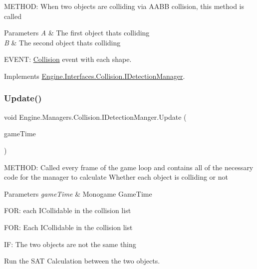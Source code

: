 M\+E\+T\+H\+OD\+: When two objects are colliding via A\+A\+BB collision, this method is called 


\begin{DoxyParams}{Parameters}
{\em A} & The first object that\textquotesingle{}s colliding\\
\hline
{\em B} & The second object that\textquotesingle{}s colliding\\
\hline
\end{DoxyParams}
E\+V\+E\+NT\+: \hyperlink{a00268}{Collision} event with each shape. 

Implements \hyperlink{a00430_ac0f8278b5b5a1c103da46f154ad088dc}{Engine.\+Interfaces.\+Collision.\+I\+Detection\+Manager}.

\mbox{\label{a00502_ac032340610657f865bdd3b7a82e316c3}} 
\subsubsection{\texorpdfstring{Update()}{Update()}}
{\footnotesize\ttfamily void Engine.\+Managers.\+Collision.\+I\+Detection\+Manger.\+Update (\begin{DoxyParamCaption}\item[{Game\+Time}]{game\+Time }\end{DoxyParamCaption})\hspace{0.3cm}{\ttfamily [inline]}}



M\+E\+T\+H\+OD\+: Called every frame of the game loop and contains all of the necessary code for the manager to calculate Whether each object is colliding or not 


\begin{DoxyParams}{Parameters}
{\em game\+Time} & Monogame Game\+Time\\
\hline
\end{DoxyParams}
F\+OR\+: each I\+Collidable in the collision list

F\+OR\+: Each I\+Collidable in the collision list

IF\+: The two objects are not the same thing

Run the S\+AT Calculation between the two objects. 

